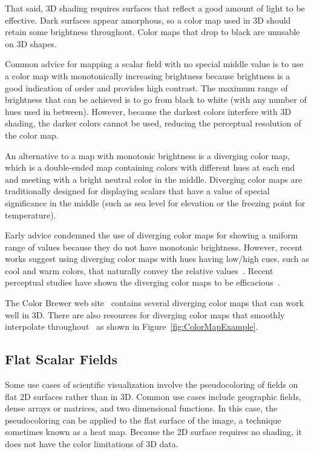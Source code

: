 \documentclass[letterpaper,twocolumn,fleqn]{article}
\newcommand*{\lcite}[1]{~\cite{#1}}
\begin{document}
That said, 3D shading requires surfaces that reflect a good amount of light
to be effective. Dark surfaces appear amorphous, so a color map used in 3D
should retain some brightness throughout. Color maps that drop to black are
unusable on 3D shapes.

Common advice for mapping a scalar field with no special middle value is to
use a color map with monotonically increasing brightness because brightness
is a good indication of order and provides high contrast. The maximum range
of brightness that can be achieved is to go from black to white (with any
number of hues used in between). However, because the darkest colors
interfere with 3D shading, the darker colors cannot be used, reducing the
perceptual resolution of the color map.

An alternative to a map with monotonic brightness is a diverging color map,
which is a double-ended map containing colors with different hues at each
end and meeting with a bright neutral color in the middle. Diverging color
maps are traditionally designed for displaying scalars that have a value of
special significance in the middle (such as sea level for elevation or the
freezing point for temperature).

Early advice condemned the use of diverging color maps for showing a
uniform range of values because they do not have monotonic brightness.
However, recent works suggest using diverging color maps with hues having
low/high cues, such as cool and warm colors, that naturally convey the
relative values\lcite{Moreland2009}. Recent perceptual studies have shown
the diverging color maps to be efficacious\lcite{Borkin2011,Samsel2015}.

The Color Brewer web site\lcite{ColorBrewerURL} contains several diverging color
maps that can work well in 3D. There are also resources for diverging color
maps that smoothly interpolate throughout\lcite{DivergingColorMapURL} as
shown in Figure~\ref{fig:ColorMapExample}.

\subsection{Flat Scalar Fields}

\noindent
Some use cases of scientific visualization involve the pseudocoloring of
fields on flat 2D surfaces rather than in 3D. Common use cases include
geographic fields, dense arrays or matrices, and two dimensional functions.
In this case, the pseudocoloring can be applied to the flat surface of the
image, a technique sometimes known as a heat map. Because the 2D surface
requires no shading, it does not have the color limitations of 3D data.
\end{document}
